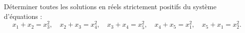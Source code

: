 Déterminer toutes les solutions en réels strictement positifs du système d'équations :
\[
x_1 + x_2 = x_3^2, \quad
x_2 + x_3 = x_4^2, \quad
x_3 + x_4 = x_5^2, \quad
x_4 + x_5 = x_1^2, \quad
x_5 + x_1 = x_2^2.
\]
